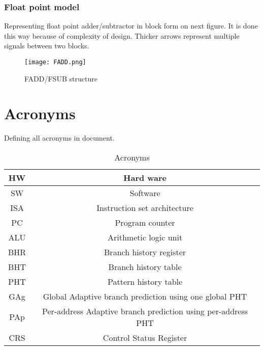 \documentclass{scrreprt}
\begin{document}
\subsubsection*{Float point model}
Representing float point adder/subtractor in block form on next figure. It is done this way because of complexity of design. Thicker arrows represent multiple signals between two blocks. 
\begin{figure}[htb!]
    \centering
    \texttt{[image: FADD.png]}
    \caption{FADD/FSUB structure}
    \label{fig:FADD}
\end{figure}

\newpage
{} 
\section*{Acronyms}
    Defining all acronyms in document. 
    \begin{table}[ht]
        \centering
        \begin{tabular}{|c|c|} \hline 
            HW & Hard ware\\ \hline 
            SW & Software\\ \hline 
            ISA & Instruction set architecture\\ \hline 
            PC & Program counter\\ \hline 
            ALU & Arithmetic logic unit\\ \hline 
            BHR & Branch history register\\ \hline
            BHT & Branch history table\\ \hline
            PHT & Pattern history table\\ \hline
            GAg & Global Adaptive branch prediction using one global PHT\\ \hline
            PAp & Per-address Adaptive branch prediction using per-address PHT\\ \hline
            CRS & Control Status Register \\ \hline
        \end{tabular}
        \caption{Acronyms}
        \label{tab:table4}
    \end{table}
\end{document}
